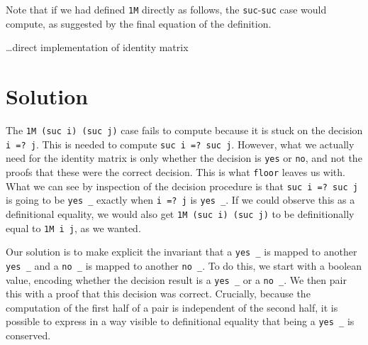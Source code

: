 \documentclass[submission,copyright,creativecommons]{eptcs}
\begin{document}
Note that if we had defined \texttt{1M} directly as follows, the
\texttt{suc}-\texttt{suc} case would compute, as suggested by the final equation
of the definition.

\dots direct implementation of identity matrix

\section{Solution}

The \texttt{1M (suc i) (suc j)} case fails to compute because it is stuck on the
decision \texttt{i =? j}.
This is needed to compute \texttt{suc i =? suc j}.
However, what we actually need for the identity matrix is only whether the
decision is \texttt{yes} or \texttt{no}, and not the proofs that these were the
correct decision.
This is what \texttt{floor} leaves us with.
What we can see by inspection of the decision procedure is that
\texttt{suc i =? suc j} is going to be \texttt{yes _} exactly when
\texttt{i =? j} is \texttt{yes _}.
If we could observe this as a definitional equality, we would also get
\texttt{1M (suc i) (suc j)} to be definitionally equal to \texttt{1M i j}, as we wanted.

Our solution is to make explicit the invariant that a \texttt{yes _} is mapped
to another \texttt{yes _} and a \texttt{no _} is mapped to another
\texttt{no _}.
To do this, we start with a boolean value, encoding whether the decision result
is a \texttt{yes _} or a \texttt{no _}.
We then pair this with a proof that this decision was correct.
Crucially, because the computation of the first half of a pair is independent of
the second half, it is possible to express in a way visible to definitional equality that being a \texttt{yes _} is conserved.

\nocite{*}


\end{document}
